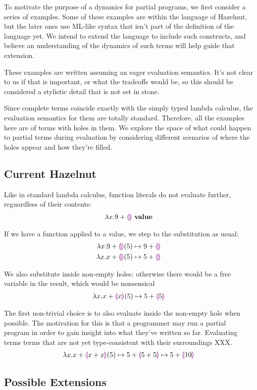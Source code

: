 To motivate the purpose of a dynamics for partial programs, we first
consider a series of examples. Some of these examples are within the language
of Hazelnut, but the later ones use ML-like syntax that isn't part of the
definition of the language yet. We intend to extend the language to include
such constructs, and believe an understanding of the dynamics of such terms
will help guide that extension.

These examples are written assuming an eager evaluation semantics. It's not
clear to us if that is important, or what the tradeoffs would be, so this
should be considered a stylistic detail that is not set in stone.

Since complete terms coincide exactly with the simply typed lambda
calculus, the evaluation semantics for them are totally
standard. Therefore, all the examples here are of terms with holes in
them. We explore the space of what could happen to partial terms during
evaluation by considering different scenarios of where the holes appear and
how they're filled.

\subsection{Current Hazelnut}
Like in standard lambda calculus, function literals do not
evaluate further, reguardless of their contents:
\begin{align*}
  {\lambda x. 9 + \textcolor{violet}{\llparenthesis}\textcolor{violet}{\rrparenthesis}} ~\mathbf{value}
\end{align*}

If we have a function applied to a value, we step to the substitution as
usual:
\begin{align*}
  {
        \lambda x.9 + \textcolor{violet}{\llparenthesis}\textcolor{violet}{\rrparenthesis}(5)
      } \mapsto {
        9 + \textcolor{violet}{\llparenthesis}\textcolor{violet}{\rrparenthesis}}
      \\
      {
        \lambda x.x + \textcolor{violet}{\llparenthesis}\textcolor{violet}{\rrparenthesis}(5)
      } \mapsto {
        5 + \textcolor{violet}{\llparenthesis}\textcolor{violet}{\rrparenthesis}}
\end{align*}

We also substitute inside non-empty holes: otherwise there would be a free
variable in the result, which would be nonsensical
\begin{align*}
  {
        \lambda x.x + \textcolor{violet}{\llparenthesis}x\textcolor{violet}{\rrparenthesis}(5)
      } \mapsto {
        5 + \textcolor{violet}{\llparenthesis}5\textcolor{violet}{\rrparenthesis}}
\end{align*}

The first non-trivial choice is to also evaluate inside the non-empty hole
when possible. The motivation for this is that a programmer may run a
partial program in order to gain insight into what they've written so
far. Evaluating terms terms that are not yet type-consistent with their
surroundings XXX.
\begin{align*}
  {
    {
          \lambda x.x + \textcolor{violet}{\llparenthesis}x + x\textcolor{violet}{\rrparenthesis}(5)
        } \mapsto {
          5 + \textcolor{violet}{\llparenthesis}5 + 5\textcolor{violet}{\rrparenthesis}}
  } \mapsto {5 + \textcolor{violet}{\llparenthesis}10\textcolor{violet}{\rrparenthesis}}
\end{align*}

\subsection{Possible Extensions}
